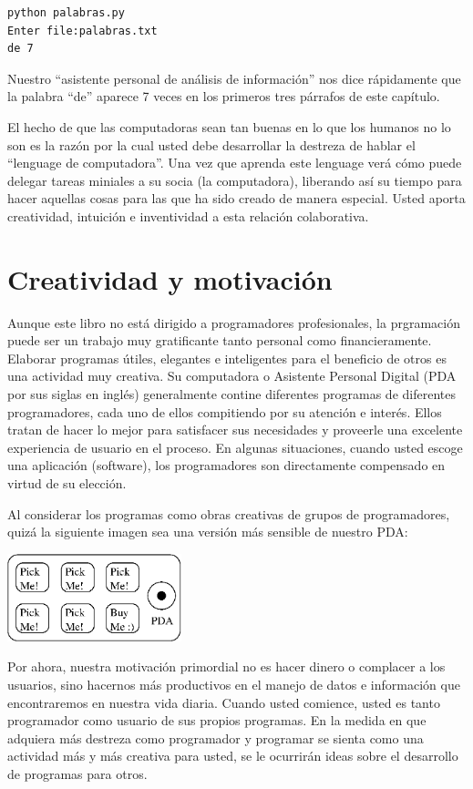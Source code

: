 \beforeverb
\begin{verbatim}
python palabras.py
Enter file:palabras.txt
de 7
\end{verbatim}
\afterverb
%
Nuestro ``asistente personal de an\'alisis de informaci\'on'' nos dice r\'apidamente que la palabra ``de'' aparece 7 veces en los primeros tres p\'arrafos de este cap\'itulo.

El hecho de que las computadoras sean tan buenas en lo que los humanos no lo son es la raz\'on por la cual usted debe desarrollar la destreza de hablar el ``lenguage de computadora''. Una vez que aprenda este lenguage ver\'a c\'omo puede delegar tareas miniales a su socia (la computadora), liberando as\'i su tiempo para hacer aquellas cosas para las que ha sido creado de manera especial. Usted aporta creatividad, intuici\'on e inventividad a esta relaci\'on colaborativa.  

\section{Creatividad y motivaci\'on}

Aunque este libro no est\'a dirigido a programadores profesionales, la prgramaci\'on puede ser un trabajo muy gratificante tanto personal como financieramente. 
Elaborar programas \'utiles, elegantes e inteligentes para el beneficio de otros es una actividad muy creativa. Su computadora o Asistente Personal Digital (PDA por sus siglas en ingl\'es) 
generalmente contine diferentes programas de diferentes programadores, cada uno de ellos compitiendo por su atenci\'on e inter\'es. Ellos tratan de hacer lo mejor para satisfacer sus necesidades y proveerle una excelente experiencia de usuario en el proceso. En algunas situaciones, cuando usted escoge una aplicaci\'on (software), los programadores son directamente compensado en virtud de su elecci\'on.

Al considerar los programas como obras creativas de grupos de programadores, quiz\'a la siguiente imagen sea una versi\'on m\'as sensible de nuestro PDA:

\beforefig
\centerline{\includegraphics[height=1.00in]{figs2/pda2.eps}}
\afterfig

Por ahora, nuestra motivaci\'on primordial no es hacer dinero o complacer a los usuarios, sino hacernos m\'as productivos en el manejo de datos e informaci\'on que encontraremos en nuestra vida diaria.
Cuando usted comience, usted es tanto programador como usuario de sus propios programas. En la medida en que adquiera m\'as destreza como programador y programar se sienta como una actividad m\'as y m\'as creativa para usted, se le ocurrir\'an ideas sobre el desarrollo de programas para otros.

